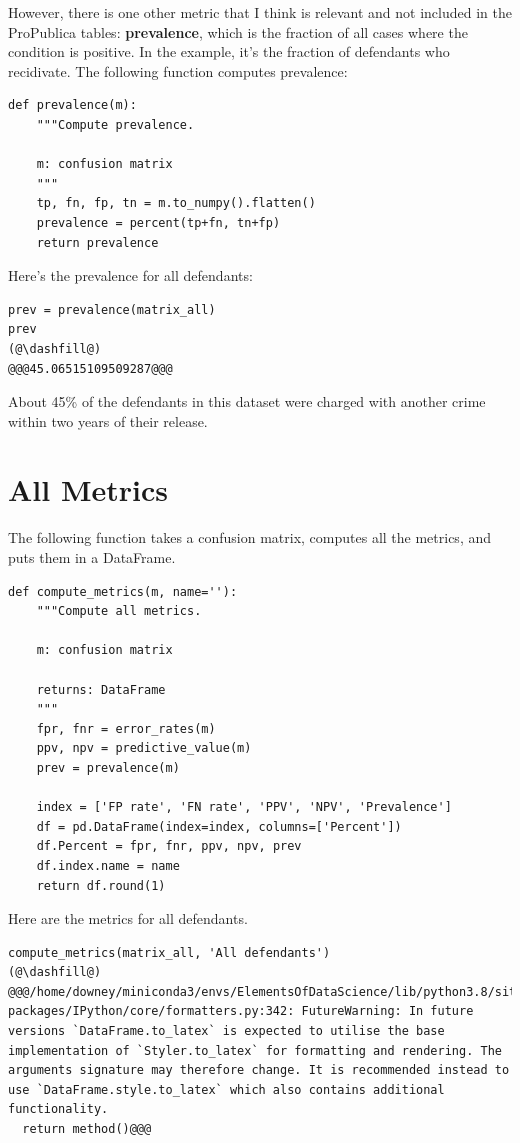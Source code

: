 However, there is one other metric that I think is relevant and not
included in the ProPublica tables: \textbf{prevalence}, which is the
fraction of all cases where the condition is positive. In the example,
it's the fraction of defendants who recidivate. The following function
computes prevalence:

\begin{lstlisting}[]
def prevalence(m):
    """Compute prevalence.
    
    m: confusion matrix
    """
    tp, fn, fp, tn = m.to_numpy().flatten()
    prevalence = percent(tp+fn, tn+fp)
    return prevalence
\end{lstlisting}

Here's the prevalence for all defendants:

\begin{lstlisting}[]
prev = prevalence(matrix_all)
prev
(@\dashfill@)
@@@45.06515109509287@@@
\end{lstlisting}

About 45\% of the defendants in this dataset were charged with another
crime within two years of their release.

\hypertarget{all-metrics}{%
\section{All Metrics}\label{all-metrics}}

The following function takes a confusion matrix, computes all the
metrics, and puts them in a DataFrame.

\begin{lstlisting}[]
def compute_metrics(m, name=''):
    """Compute all metrics.
    
    m: confusion matrix
    
    returns: DataFrame
    """
    fpr, fnr = error_rates(m)
    ppv, npv = predictive_value(m)
    prev = prevalence(m)
    
    index = ['FP rate', 'FN rate', 'PPV', 'NPV', 'Prevalence']
    df = pd.DataFrame(index=index, columns=['Percent'])
    df.Percent = fpr, fnr, ppv, npv, prev
    df.index.name = name
    return df.round(1)
\end{lstlisting}

Here are the metrics for all defendants.

\begin{lstlisting}[]
compute_metrics(matrix_all, 'All defendants')
(@\dashfill@)
@@@/home/downey/miniconda3/envs/ElementsOfDataScience/lib/python3.8/site-packages/IPython/core/formatters.py:342: FutureWarning: In future versions `DataFrame.to_latex` is expected to utilise the base implementation of `Styler.to_latex` for formatting and rendering. The arguments signature may therefore change. It is recommended instead to use `DataFrame.style.to_latex` which also contains additional functionality.
  return method()@@@
\end{lstlisting}

